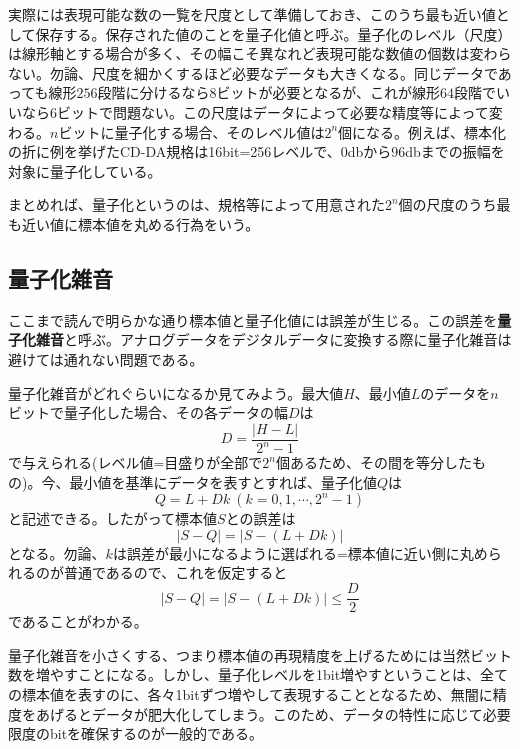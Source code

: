 実際には表現可能な数の一覧を尺度として準備しておき、このうち最も近い値として保存する。保存された値のことを量子化値と呼ぶ。量子化のレベル（尺度）は線形軸とする場合が多く、その幅こそ異なれど表現可能な数値の個数は変わらない。勿論、尺度を細かくするほど必要なデータも大きくなる。同じデータであっても線形$256$段階に分けるなら$8$ビットが必要となるが、これが線形$64$段階でいいなら$6$ビットで問題ない。この尺度はデータによって必要な精度等によって変わる。$n$ビットに量子化する場合、そのレベル値は$2^n$個になる。例えば、標本化の折に例を挙げたCD-DA規格は16bit=256レベルで、0dbから96dbまでの振幅を対象に量子化している。

まとめれば、量子化というのは、規格等によって用意された$2^n$個の尺度のうち最も近い値に標本値を丸める行為をいう。

\subsection{量子化雑音}
ここまで読んで明らかな通り標本値と量子化値には誤差が生じる。この誤差を\textbf{量子化雑音}と呼ぶ。アナログデータをデジタルデータに変換する際に量子化雑音は避けては通れない問題である。

量子化雑音がどれぐらいになるか見てみよう。最大値$H$、最小値$L$のデータを$n$ビットで量子化した場合、その各データの幅$D$は
\begin{equation}
D=\frac{|H-L|}{2^n-1}
\end{equation}
で与えられる(レベル値=目盛りが全部で$2^n$個あるため、その間を等分したもの)。今、最小値を基準にデータを表すとすれば、量子化値$Q$は
\begin{equation}
Q=L+Dk \ (k=0,1,\cdots,2^n-1)
\end{equation}
と記述できる。したがって標本値$S$との誤差は
\begin{equation}
|S-Q|=|S-(L+Dk)|
\end{equation}
となる。勿論、$k$は誤差が最小になるように選ばれる=標本値に近い側に丸められるのが普通であるので、これを仮定すると
\begin{equation}
|S-Q|=|S-(L+Dk)|\le \frac{D}{2}
\end{equation}
であることがわかる。

量子化雑音を小さくする、つまり標本値の再現精度を上げるためには当然ビット数を増やすことになる。しかし、量子化レベルを1bit増やすということは、全ての標本値を表すのに、各々1bitずつ増やして表現することとなるため、無闇に精度をあげるとデータが肥大化してしまう。このため、データの特性に応じて必要限度のbitを確保するのが一般的である。

